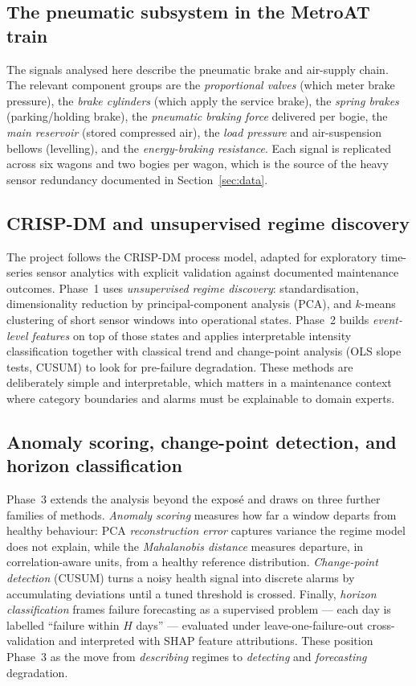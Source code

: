 \documentclass[11pt,a4paper]{article}
\begin{document}
\subsection{The pneumatic subsystem in the MetroAT train}
The signals analysed here describe the pneumatic brake and air-supply chain. The
relevant component groups are the \emph{proportional valves} (which meter brake
pressure), the \emph{brake cylinders} (which apply the service brake), the
\emph{spring brakes} (parking/holding brake), the \emph{pneumatic braking force}
delivered per bogie, the \emph{main reservoir} (stored compressed air), the
\emph{load pressure} and air-suspension bellows (levelling), and the
\emph{energy-braking resistance}. Each signal is replicated across six wagons and two
bogies per wagon, which is the source of the heavy sensor redundancy documented in
Section~\ref{sec:data}.

\subsection{CRISP-DM and unsupervised regime discovery}
The project follows the CRISP-DM process model, adapted for exploratory time-series
sensor analytics with explicit validation against documented maintenance outcomes.
Phase~1 uses \emph{unsupervised regime discovery}: standardisation, dimensionality
reduction by principal-component analysis (PCA), and $k$-means clustering of short
sensor windows into operational states. Phase~2 builds \emph{event-level features} on
top of those states and applies interpretable intensity classification together with
classical trend and change-point analysis (OLS slope tests, CUSUM) to look for
pre-failure degradation. These methods are deliberately simple and interpretable, which
matters in a maintenance context where category boundaries and alarms must be
explainable to domain experts.

\subsection{Anomaly scoring, change-point detection, and horizon classification}
Phase~3 extends the analysis beyond the exposé and draws on three further families of
methods. \emph{Anomaly scoring} measures how far a window departs from healthy
behaviour: PCA \emph{reconstruction error} captures variance the regime model does not
explain, while the \emph{Mahalanobis distance} measures departure, in correlation-aware
units, from a healthy reference distribution. \emph{Change-point detection} (CUSUM)
turns a noisy health signal into discrete alarms by accumulating deviations until a
tuned threshold is crossed. Finally, \emph{horizon classification} frames failure
forecasting as a supervised problem --- each day is labelled ``failure within $H$ days''
--- evaluated under leave-one-failure-out cross-validation and interpreted with SHAP
feature attributions. These position Phase~3 as the move from \emph{describing} regimes
to \emph{detecting} and \emph{forecasting} degradation.
\end{document}
